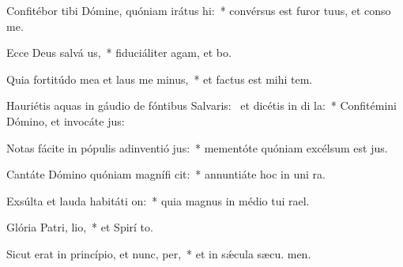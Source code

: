 \item Confitébor tibi Dómine, quóniam irátus  hi:~* convérsus est furor tuus, et conso  me.
\item Ecce Deus salvá us,~* fiduciáliter agam, et  bo.
\item Quia fortitúdo mea et laus me minus,~* et factus est mihi  tem.
\item Hauriétis aquas in gáudio de fóntibus Salvaris:~\pscross{} et dicétis in di la:~* Confitémini Dómino, et invocáte  jus:
\item Notas fácite in pópulis adinventió jus:~* mementóte quóniam excélsum est  jus.
\item Cantáte Dómino quóniam magnífi cit:~* annuntiáte hoc in uni ra.
\item Exsúlta et lauda habitáti on:~* quia magnus in médio tui  rael.
\item Glória Patri,  lio,~* et Spirí to.
\item Sicut erat in princípio, et nunc,  per,~* et in sǽcula sæcu. men.

